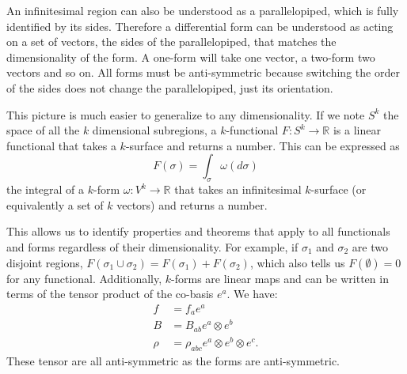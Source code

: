 \documentclass[10pt,twocolumn, nofootinbib]{revtex4-2}
\begin{document}
An infinitesimal region can also be understood as a parallelopiped, which is fully identified by its sides. Therefore a differential form can be understood as acting on a set of vectors, the sides of the parallelopiped, that matches the dimensionality of the form. A one-form will take one vector, a two-form two vectors and so on. All forms must be anti-symmetric because switching the order of the sides does not change the parallelopiped, just its orientation.

This picture is much easier to generalize to any dimensionality. If we note $S^k$ the space of all the $k$ dimensional subregions, a $k$-functional $F : S^k \to \mathbb{R}$ is a linear functional that takes a $k$-surface and returns a number. This can be expressed as
\begin{equation*}
	F(\sigma) = \int_\sigma \omega(d\sigma)
\end{equation*}
the integral of a $k$-form $\omega : V^k \to \mathbb{R}$ that takes an infinitesimal $k$-surface (or equivalently a set of $k$ vectors) and returns a number.

This allows us to identify properties and theorems that apply to all functionals and forms regardless of their dimensionality. For example, if $\sigma_1$ and $\sigma_2$ are two disjoint regions, $F(\sigma_1 \cup \sigma_2) = F(\sigma_1) + F(\sigma_2)$, which also tells us $F(\emptyset) = 0$ for any functional. Additionally, $k$-forms are linear maps and can be written in terms of the tensor product of the co-basis $e^a$. We have:
\begin{equation*}
	\begin{aligned}
		f &= f_a e^a \\
		B &= B_{ab} e^a \otimes e^b \\
		\rho &= \rho_{abc} e^a \otimes e^b \otimes e^c.
	\end{aligned}
\end{equation*}
These tensor are all anti-symmetric as the forms are anti-symmetric.






\end{document}
